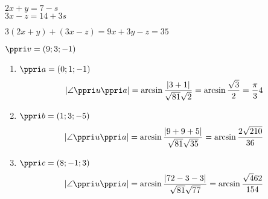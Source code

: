 $2x+y = 7 - s $\\
$3x-z = 14 + 3 s$

$3(2x+y)+(3x-z) = 9x+3y-z = 35$

$\ve v = (9;3;-1)$


\begin{enumerate}
	\item  $ \ve a = (0;1;-1) $
		$$|\angle \ve{u}\ve{a}| = \arcsin \f{|3+1|}{\sqrt{81}\*\sqrt 2} = \arcsin \f{\sqrt 3}{2} = \f\pi34$$
	\item  $ \ve b = (1;3;-5) $
		$$|\angle \ve{u}\ve{a}| = \arcsin \f{|9+9+5|}{\sqrt{81}\*\sqrt{35}} = \arcsin \f{2\sqrt{210}}{36}$$

	\item  $ \ve c = (8;-1;3) $
		$$|\angle \ve{u}\ve{a}| = \arcsin \f{|72-3-3|}{\sqrt{81}\*\sqrt{77}} = \arcsin \f{\sqrt 462}{154}$$
\end{enumerate}




\EndDoc

